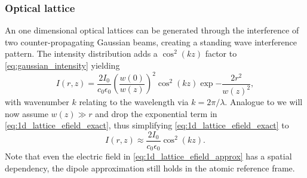 \subsubsection{Optical lattice}

An one dimensional optical lattices can be generated through the interference
of two counter-propagating Gaussian beams, creating a standing wave
interference pattern. The intensity distribution adds a $\cos^2(kz)$ factor
to \cref{eq:gaussian_intensity} yielding
\begin{equation}
  I(r,z)
  =
  \frac{2I_0}{c_0\epsilon_0}
  \left(\frac{w(0)}{w(z)}\right)^2
  \cos^2(kz)
  \exp{-\frac{2r^2}{w(z)^2}}
  \label{eq:1d_lattice_efield_exact},
\end{equation}
with wavenumber $k$ relating to the wavelength via $k=2\pi/\lambda$. Analogue
to \cite{Rom2009} we will now assume $w(z)\gg r$ and drop the exponential
term in \cref{eq:1d_lattice_efield_exact}, thus simplifying
\cref{eq:1d_lattice_efield_exact} to
\begin{equation}
  I(r,z)
  \approx
  \frac{2I_0}{c_0\epsilon_0}\cos^2(kz)
  \label{eq:1d_lattice_efield_approx}.
\end{equation}
Note that even the electric field in \cref{eq:1d_lattice_efield_approx} has
a spatial dependency, the dipole approximation still holds in the atomic
reference frame.

